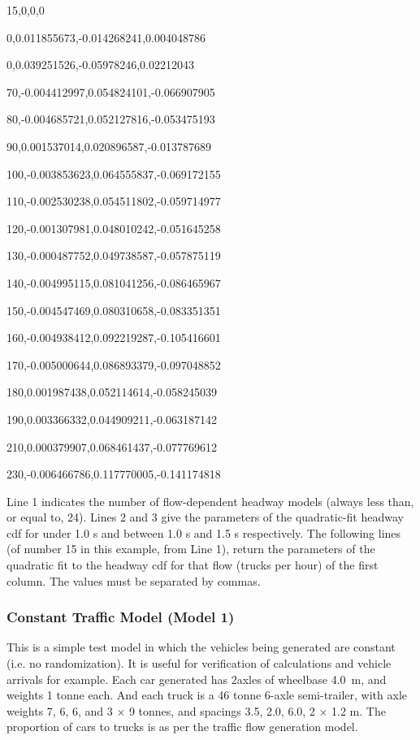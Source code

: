 \documentclass[
]{article}
\begin{document}
15,0,0,0

0,0.011855673,-0.014268241,0.004048786

0,0.039251526,-0.05978246,0.02212043

70,-0.004412997,0.054824101,-0.066907905

80,-0.004685721,0.052127816,-0.053475193

90,0.001537014,0.020896587,-0.013787689

100,-0.003853623,0.064555837,-0.069172155

110,-0.002530238,0.054511802,-0.059714977

120,-0.001307981,0.048010242,-0.051645258

130,-0.000487752,0.049738587,-0.057875119

140,-0.004995115,0.081041256,-0.086465967

150,-0.004547469,0.080310658,-0.083351351

160,-0.004938412,0.092219287,-0.105416601

170,-0.005000644,0.086893379,-0.097048852

180,0.001987438,0.052114614,-0.058245039

190,0.003366332,0.044909211,-0.063187142

210,0.000379907,0.068461437,-0.077769612

230,-0.006466786,0.117770005,-0.141174818

Line 1 indicates the number of flow-dependent headway models (always
less than, or equal to, 24). Lines 2 and 3 give the parameters of the
quadratic-fit headway cdf for under 1.0 s and between 1.0 s and 1.5 s
respectively. The following lines (of number 15 in this example, from
Line 1), return the parameters of the quadratic fit to the headway cdf
for that flow (trucks per hour) of the first column. The values must be
separated by commas.

\subsubsection*{Constant Traffic Model (Model
1)}\label{constant-traffic-model-model-1}

This is a simple test model in which the vehicles being generated are
constant (i.e. no randomization). It is useful for verification of
calculations and vehicle arrivals for example. Each car generated has
2axles of wheelbase 4.0~m, and weights 1 tonne each. And each truck is a
46 tonne 6-axle semi-trailer, with axle weights 7, 6, 6, and 3 × 9
tonnes, and spacings 3.5, 2.0, 6.0, 2 × 1.2 m. The proportion of cars to
trucks is as per the traffic flow generation model.
\end{document}
